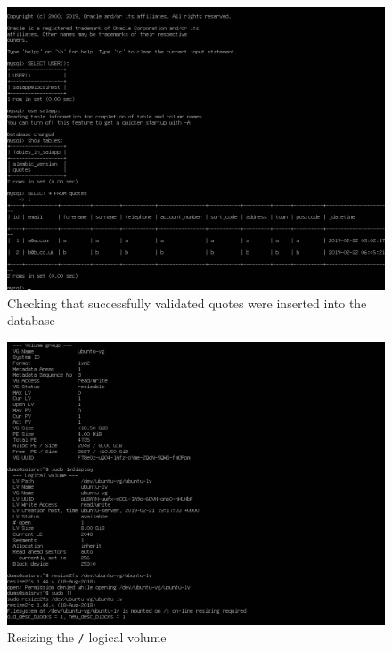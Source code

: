 \begin{figure}[h!]
\centering
\captionsetup{skip=\skipfigurecaptionlen}
\includegraphics[width=1\textwidth]{screenshots/IY2D502-2019-02-22-06-50-24.png}
\caption{Checking that successfully validated quotes were inserted into the database}
\label{fig:IY2D502-2019-02-22-06-50-24}
\end{figure}
\pagebreak
\begin{figure}[h!]
\centering
\captionsetup{skip=\skipfigurecaptionlen}
\includegraphics[width=1\textwidth]{screenshots/IY2D502-2019-02-22-23-39-52.png}
\caption{Resizing the \texttt{/} logical volume}
\label{fig:IY2D502-2019-02-22-23-39-52}
\end{figure}
\pagebreak
